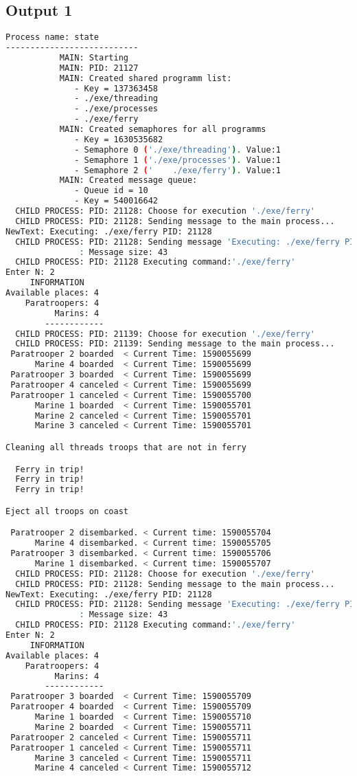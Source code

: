 \documentclass{article}
\begin{document}
\subsection{Output 1}
\begin{lstlisting}[language=BASH]
   Process name: state
---------------------------
           MAIN: Starting
           MAIN: PID: 21127
           MAIN: Created shared programm list:
              - Key = 137363458
              - ./exe/threading
              - ./exe/processes
              - ./exe/ferry
           MAIN: Created semaphores for all programms
              - Key = 1630535682
              - Semaphore 0 ('./exe/threading'). Value:1
              - Semaphore 1 ('./exe/processes'). Value:1
              - Semaphore 2 ('    ./exe/ferry'). Value:1
           MAIN: Created message queue:
              - Queue id = 10
              - Key = 540016642
  CHILD PROCESS: PID: 21128: Choose for execution './exe/ferry'
  CHILD PROCESS: PID: 21128: Sending message to the main process...
NewText: Executing: ./exe/ferry PID: 21128
  CHILD PROCESS: PID: 21128: Sending message 'Executing: ./exe/ferry PID: 21128' to the MAIN process...
               : Message size: 43
  CHILD PROCESS: PID: 21128 Executing command:'./exe/ferry'
Enter N: 2
     INFORMATION
Available places: 4
    Paratroopers: 4
          Marins: 4
        ------------
  CHILD PROCESS: PID: 21139: Choose for execution './exe/ferry'
  CHILD PROCESS: PID: 21139: Sending message to the main process...
 Paratrooper 2 boarded  < Current Time: 1590055699 
      Marine 4 boarded  < Current Time: 1590055699 
 Paratrooper 3 boarded  < Current Time: 1590055699 
 Paratrooper 4 canceled < Current Time: 1590055699 
 Paratrooper 1 canceled < Current Time: 1590055700 
      Marine 1 boarded  < Current Time: 1590055701 
      Marine 2 canceled < Current Time: 1590055701 
      Marine 3 canceled < Current Time: 1590055701 

Cleaning all threads troops that are not in ferry

  Ferry in trip!
  Ferry in trip!
  Ferry in trip!

Eject all troops on coast

 Paratrooper 2 disembarked. < Current time: 1590055704
      Marine 4 disembarked. < Current time: 1590055705
 Paratrooper 3 disembarked. < Current time: 1590055706
      Marine 1 disembarked. < Current time: 1590055707
  CHILD PROCESS: PID: 21128: Choose for execution './exe/ferry'
  CHILD PROCESS: PID: 21128: Sending message to the main process...
NewText: Executing: ./exe/ferry PID: 21128
  CHILD PROCESS: PID: 21128: Sending message 'Executing: ./exe/ferry PID: 21128' to the MAIN process...
               : Message size: 43
  CHILD PROCESS: PID: 21128 Executing command:'./exe/ferry'
Enter N: 2
     INFORMATION
Available places: 4
    Paratroopers: 4
          Marins: 4
        ------------
 Paratrooper 3 boarded  < Current Time: 1590055709 
 Paratrooper 4 boarded  < Current Time: 1590055709 
      Marine 1 boarded  < Current Time: 1590055710 
      Marine 2 boarded  < Current Time: 1590055711 
 Paratrooper 2 canceled < Current Time: 1590055711 
 Paratrooper 1 canceled < Current Time: 1590055711 
      Marine 3 canceled < Current Time: 1590055711 
      Marine 4 canceled < Current Time: 1590055712 


\end{lstlisting}
\end{document}
